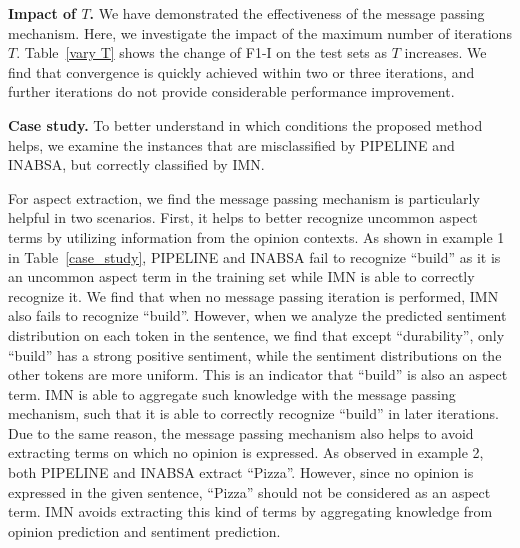 \documentclass[11pt,a4paper]{article}
\begin{document}
\noindent\textbf{Impact of $T$.}
We have demonstrated the effectiveness of the message passing mechanism. Here, we investigate the impact of the maximum number of iterations $T$. Table~\ref{vary T} shows the change of F1-I on the test sets as $T$ increases. We find that convergence is quickly achieved within two or three iterations, and further iterations do not provide considerable performance improvement. 
\medskip

\noindent\textbf{Case study.}
To better understand in which conditions the proposed method helps, we examine the instances that are misclassified by PIPELINE and INABSA, but correctly classified by IMN. 

For aspect extraction, we find the message passing mechanism is particularly helpful in two scenarios. First, it helps to better recognize uncommon aspect terms by utilizing information from the opinion contexts. As shown in example 1 in Table~\ref{case_study}, PIPELINE and INABSA fail to recognize ``build'' as it is an uncommon aspect term in the training set while IMN is able to correctly recognize it. We find that when no message passing iteration is performed, IMN also fails to recognize ``build''. However, when we analyze the predicted sentiment distribution on each token in the sentence, we find that except ``durability'', only ``build'' has a strong positive sentiment, while the sentiment distributions on the other tokens are more uniform. This is an indicator that ``build'' is also an aspect term. IMN is able to aggregate such knowledge with the message passing mechanism, such that it is able to correctly recognize ``build'' in later iterations. 
Due to the same reason, the message passing mechanism also helps to avoid extracting terms on which no opinion is expressed. As observed in example 2, both PIPELINE and INABSA extract ``Pizza''. However, since no opinion is expressed in the given sentence, ``Pizza'' should not be considered as an aspect term. IMN avoids extracting this kind of terms by aggregating knowledge from opinion prediction and sentiment prediction. 
\end{document}
